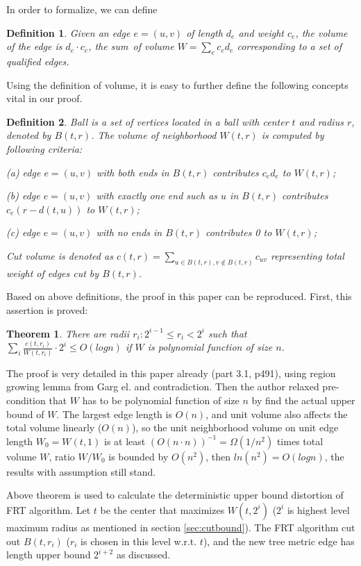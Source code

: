 \documentclass[11pt,twocolumn]{IEEEtran}
\newtheorem{Definition}{Definition}[section]
\newtheorem{Theorem}{Theorem}[section]
\begin{document}
In order to formalize, we can define
\begin{Definition}
Given an edge $e = (u,v)$ of length $d_e$ and weight $c_e$, the \emph{volume} of the edge is $d_e\cdot c_e$,
the \emph{sum\ of volume} $W = \sum_ec_ed_e$ corresponding to a set of qualified edges.
\end{Definition}

Using the definition of volume, it is easy to further define the following concepts vital in our proof.

\begin{Definition}
\emph{Ball} is a set of vertices located in a ball with center $t$ and radius $r$, denoted by $B(t,r)$.
The \emph{volume of neighborhood} $W(t,r)$ is computed by following criteria:\par
(a) edge $e=(u,v)$ with both ends in $B(t,r)$ contributes $c_ed_e$ to $W(t,r)$;\par
(b) edge $e=(u,v)$ with exactly one end such as $u$ in $B(t,r)$ contributes $c_e(r-d(t,u))$ to $W(t,r)$;\par
(c) edge $e=(u,v)$ with no ends in $B(t,r)$ contributes 0 to $W(t,r)$;\par
\emph{Cut volume} is denoted as $c(t,r)=\sum_{u\in B(t,r),v\notin B(t,r)}c_{uv}$ representing total weight of
edges cut by $B(t,r)$.
\end{Definition}

Based on above definitions, the proof in this paper can be reproduced. First, this assertion is proved:
\begin{Theorem}
There are radii $r_i: 2^{i-1}\leq r_i < 2^i$ such that $\sum_i\frac{c(t,r_i)}{W(t,r_i)}\cdot 2^i \leq O(logn)$
if $W$ is polynomial function of size $n$.
\end{Theorem}

The proof is very detailed in this paper already (part 3.1, p491), using region growing lemma from Garg el.\cite{Garg}
and contradiction. Then the author relaxed pre-condition that $W$ has to be polynomial function of 
size $n$ by find the actual upper bound of $W$. The largest edge length is $O(n)$, and unit volume
also affects the total volume linearly ($O(n)$), so the unit neighborhood volume on unit edge length $W_0 = W(t,1)$ is at least $(O(n\cdot n))^{-1} = \Omega(1/n^2)$ times total volume $W$, ratio $W/W_0$ is bounded
by $O(n^2)$, then $ln(n^2) = O(logn)$, the results with assumption still stand.

Above theorem is used to calculate the deterministic upper bound distortion of FRT algorithm.
Let $t$ be the center that maximizes $W(t,2^i)$ ($2^i$ is highest level maximum radius as mentioned in 
section \ref{sec:cutbound}). The FRT algorithm cut out $B(t,r_i)$ ($r_i$ is chosen in this level w.r.t. $t$),
and the new tree metric edge has length upper bound $2^{i+2}$ as discussed.
\end{document}
